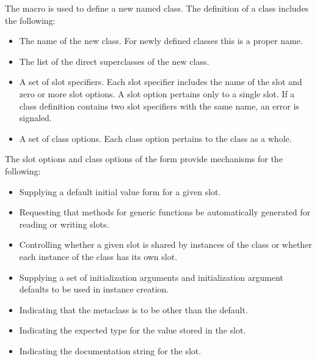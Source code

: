 The macro  is used to define a new named class.
The definition of a class includes the following:

\begin{itemize}

\item  The name of the new class. For newly defined classes
this is a proper name.

\item  The list of the direct superclasses of the new class. 

\item  A set of {\bit slot specifiers}.  Each slot specifier
includes the name of the slot and zero or more {\bit slot options}.  A
slot option pertains only to a single slot. If a class definition
contains two slot specifiers with the same name, an error is signaled.

\item  A set of {\bit class options}.  Each class option pertains 
to the class as a whole.  
\end{itemize}
The slot options and class options of the  form provide
mechanisms for the following:

\begin{itemize}

\item  Supplying a default initial value form for a given slot.  

\item  Requesting that methods for generic functions
be automatically generated for reading or writing slots. 

\item  Controlling whether a given slot is shared by instances
of the class or whether each instance of the class has its own slot.

\item  Supplying a set of initialization arguments and initialization
argument defaults to be used in instance creation.


\item  Indicating that the metaclass is to be other than the default.

\item  Indicating the expected type for the value stored in the slot.

\item  Indicating the documentation string for the slot.

\end{itemize} 

